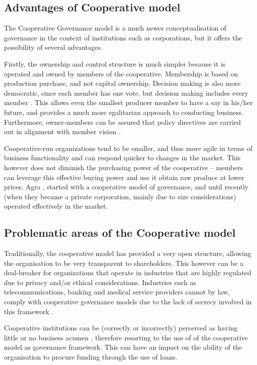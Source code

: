 \documentclass[]{article}
\begin{document}
\subsection{Advantages of Cooperative
model}\label{advantages-of-cooperative-model}

The Cooperative Governance model is a much newer conceptualisation of
governance in the context of institutions such as corporations, but it
offers the possibility of several advantages.

Firstly, the ownership and control structure is much simpler because it
is operated and owned by members of the cooperative. Membership is based
on production purchase, and not capital ownership. Decision making is
also more democratic, since each member has one vote, but decision
making includes every member \citep{chron}. This allows even the
smallest producer member to have a say in his/her future, and provides a
much more egalitarian approach to conducting business. Furthermore,
owner-members can be assured that policy directives are carried out in
alignment with member vision \citep{bancobr}.

Cooperative-run organizations tend to be smaller, and thus more agile in
terms of business functionality and can respond quicker to changes in
the market. This however does not diminish the purchasing power of the
cooperative -- members can leverage this effective buying power and use
it obtain raw produce at lower prices. Agra \citep{agra}, started with a
cooperative model of governance, and until recently (when they became a
private corporation, mainly due to size considerations) operated
effectively in the market.

\subsection{Problematic areas of the Cooperative
model}\label{problematic-areas-of-the-cooperative-model}

Traditionally, the cooperative model has provided a very open structure,
allowing the organisation to be very transparent to shareholders. This
however can be a deal-breaker for organizations that operate in
industries that are highly regulated due to privacy and/or ethical
considerations. Industries such as telecommunications, banking and
medical service providers cannot by law, comply with cooperative
governance models due to the lack of secrecy involved in this framework
\citep{yal}.

Cooperative institutions can be (correctly or incorrectly) perceived as
having little or no business acumen \citep{yal}, therefore resorting to
the use of of the cooperative model as governance framework. This can
have an impact on the ability of the organisation to procure funding
through the use of loans.
\end{document}

